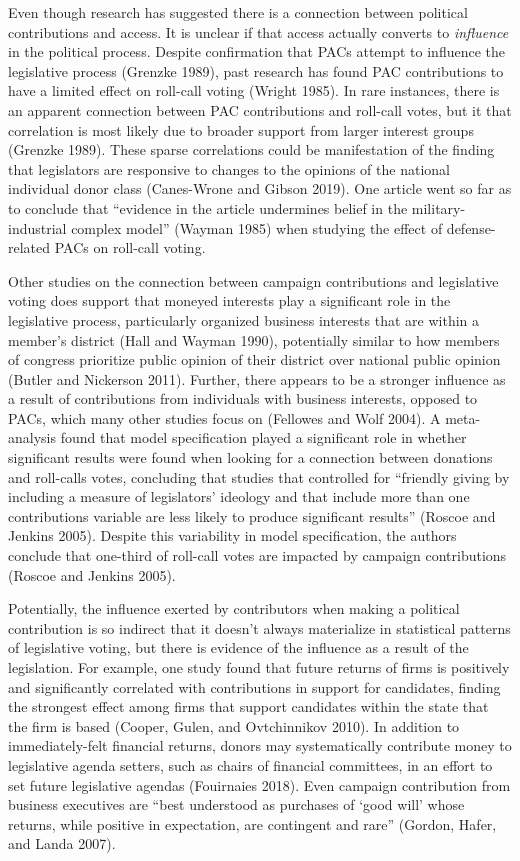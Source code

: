 \documentclass[12pt,]{article}
\begin{document}
Even though research has suggested there is a connection between
political contributions and access. It is unclear if that access
actually converts to \emph{influence} in the political process. Despite
confirmation that PACs attempt to influence the legislative process
(Grenzke 1989), past research has found PAC contributions to have a
limited effect on roll-call voting (Wright 1985). In rare instances,
there is an apparent connection between PAC contributions and roll-call
votes, but it that correlation is most likely due to broader support
from larger interest groups (Grenzke 1989). These sparse correlations
could be manifestation of the finding that legislators are responsive to
changes to the opinions of the national individual donor class
(Canes-Wrone and Gibson 2019). One article went so far as to conclude
that ``evidence in the article undermines belief in the
military-industrial complex model'' (Wayman 1985) when studying the
effect of defense-related PACs on roll-call voting.

Other studies on the connection between campaign contributions and
legislative voting does support that moneyed interests play a
significant role in the legislative process, particularly organized
business interests that are within a member's district (Hall and Wayman
1990), potentially similar to how members of congress prioritize public
opinion of their district over national public opinion (Butler and
Nickerson 2011). Further, there appears to be a stronger influence as a
result of contributions from individuals with business interests,
opposed to PACs, which many other studies focus on (Fellowes and Wolf
2004). A meta-analysis found that model specification played a
significant role in whether significant results were found when looking
for a connection between donations and roll-calls votes, concluding that
studies that controlled for ``friendly giving by including a measure of
legislators' ideology and that include more than one contributions
variable are less likely to produce significant results'' (Roscoe and
Jenkins 2005). Despite this variability in model specification, the
authors conclude that one-third of roll-call votes are impacted by
campaign contributions (Roscoe and Jenkins 2005).

Potentially, the influence exerted by contributors when making a
political contribution is so indirect that it doesn't always materialize
in statistical patterns of legislative voting, but there is evidence of
the influence as a result of the legislation. For example, one study
found that future returns of firms is positively and significantly
correlated with contributions in support for candidates, finding the
strongest effect among firms that support candidates within the state
that the firm is based (Cooper, Gulen, and Ovtchinnikov 2010). In
addition to immediately-felt financial returns, donors may
systematically contribute money to legislative agenda setters, such as
chairs of financial committees, in an effort to set future legislative
agendas (Fouirnaies 2018). Even campaign contribution from business
executives are ``best understood as purchases of `good will' whose
returns, while positive in expectation, are contingent and rare''
(Gordon, Hafer, and Landa 2007).
\end{document}
